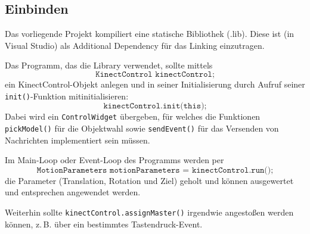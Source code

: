 \subsection{Einbinden}\label{sec:einbinden}
Das vorliegende Projekt kompiliert eine statische Bibliothek (.lib). Diese ist (in Visual Studio) als \glqq{}Additional Dependency\grqq{} für das Linking einzutragen.\par\medskip
Das Programm, das die Library verwendet, sollte mittels \[\texttt{KinectControl kinectControl;}\]ein KinectControl-Objekt anlegen und in seiner Initialisierung durch Aufruf seiner \texttt{init()}-Funktion mitinitialisieren: \[\texttt{kinectControl.init(this);}\] Dabei wird ein \texttt{ControlWidget} übergeben, für welches die Funktionen \texttt{pickModel()} für die Objektwahl sowie \texttt{sendEvent()} für das Versenden von Nachrichten implementiert sein müssen.\par
Im Main-Loop oder Event-Loop des Programms werden per \[\texttt{MotionParameters motionParameters = kinectControl.run();}\] die Parameter (Translation, Rotation und Ziel) geholt und können ausgewertet und entsprechen angewendet werden.\par 
Weiterhin sollte \texttt{kinectControl.assignMaster()} irgendwie angestoßen werden können, z.\,B. über ein bestimmtes Tastendruck-Event.